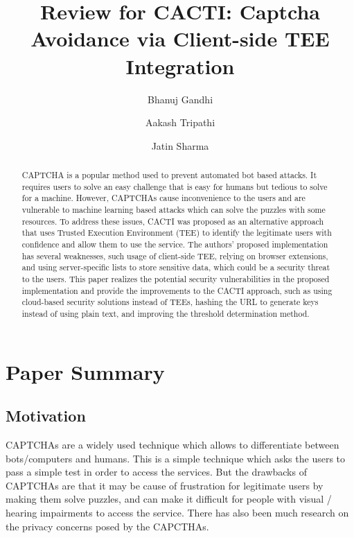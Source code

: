 \documentclass[runningheads,10pt]{llncs}
\begin{document}
	\title{Review for CACTI: Captcha Avoidance via Client-side TEE Integration}
	\author{Bhanuj Gandhi
		\and
		Aakash Tripathi
		\and
		Jatin Sharma}
	\maketitle              %
	\begin{abstract}
		CAPTCHA is a popular method used to prevent automated bot based attacks. It requires users to solve an easy challenge that is easy for humans but tedious to solve for a machine. However, CAPTCHAs cause inconvenience to the users and are vulnerable to machine learning based attacks which can solve the puzzles with some resources. To address these issues, CACTI was proposed as an alternative approach that uses Trusted Execution Environment (TEE) to identify the legitimate users with confidence and allow them to use the service. The authors’ proposed implementation has several weaknesses, such usage of client-side TEE, relying on browser extensions, and using server-specific lists to store sensitive data, which could be a security threat to the users. This paper realizes the potential security vulnerabilities in the proposed implementation and provide the improvements to the CACTI approach, such as using cloud-based security solutions instead of TEEs, hashing the URL to generate keys instead of using plain text, and improving the threshold determination method.
	\end{abstract}

	\section{Paper Summary}\label{summary}

	\subsection{Motivation}

	CAPTCHAs are a widely used technique which allows to differentiate between bots/computers and humans. This is a simple technique which asks the users to pass a simple test in order to access the services. But the drawbacks of CAPTCHAs are that it may be cause of frustration for legitimate users by making them solve puzzles, and can make it difficult for people with visual / hearing impairments to access the service. There has also been much research on the privacy concerns posed by the CAPCTHAs.
\end{document}
